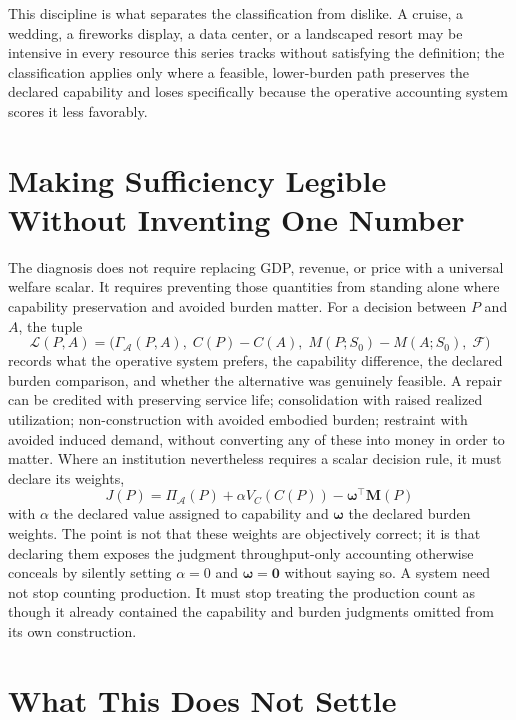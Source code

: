 \documentclass[11pt]{article}
\begin{document}
This discipline is what separates the classification from dislike. A cruise, a wedding, a fireworks display, a data center, or a landscaped resort may be intensive in every resource this series tracks without satisfying the definition; the classification applies only where a feasible, lower-burden path preserves the declared capability and loses specifically because the operative accounting system scores it less favorably.

\section{Making Sufficiency Legible Without Inventing One Number}

The diagnosis does not require replacing GDP, revenue, or price with a universal welfare scalar. It requires preventing those quantities from standing alone where capability preservation and avoided burden matter. For a decision between $P$ and $A$, the tuple
\[
\mathcal{L}(P, A) = \big(\Gamma_{\mathcal{A}}(P, A),\; C(P) - C(A),\; M(P; S_0) - M(A; S_0),\; \mathcal{F}\big)
\]
records what the operative system prefers, the capability difference, the declared burden comparison, and whether the alternative was genuinely feasible. A repair can be credited with preserving service life; consolidation with raised realized utilization; non-construction with avoided embodied burden; restraint with avoided induced demand, without converting any of these into money in order to matter. Where an institution nevertheless requires a scalar decision rule, it must declare its weights,
\[
J(P) = \Pi_{\mathcal{A}}(P) + \alpha V_C(C(P)) - \boldsymbol{\omega}^{\top} \mathbf{M}(P)
\]
with $\alpha$ the declared value assigned to capability and $\boldsymbol{\omega}$ the declared burden weights. The point is not that these weights are objectively correct; it is that declaring them exposes the judgment throughput-only accounting otherwise conceals by silently setting $\alpha = 0$ and $\boldsymbol{\omega} = \mathbf{0}$ without saying so. A system need not stop counting production. It must stop treating the production count as though it already contained the capability and burden judgments omitted from its own construction.

\section{What This Does Not Settle}
\end{document}
